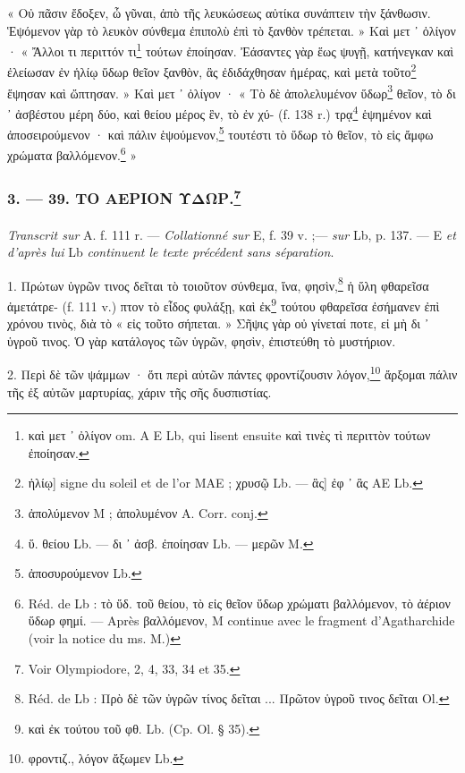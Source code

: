\documentclass[a4paper, 11pt, oneside, polutonikogreek, french]{article}
\begin{document}
« Οὐ πᾶσιν ἔδοξεν, ὦ γῦναι, ἀπὸ τῆς λευκώσεως αὐτίκα συνάπτειν τὴν ξάνθωσιν. Ἑψόμενον γὰρ τὸ λευκὸν σύνθεμα ἐπιπολὺ ἐπὶ τὸ ξανθὸν τρέπεται. » Καὶ μετ ᾽ ὀλίγον · « Ἄλλοι τι περιττόν τι\footnote{καὶ μετ ᾽ ὀλίγον om. A E Lb, qui lisent ensuite καὶ τινὲς τὶ περιττὸν τούτων ἐποίησαν.} τούτων ἐποίησαν. Ἐάσαντες γὰρ ἕως ψυγῇ, κατήνεγκαν καὶ ἐλείωσαν ἐν ἡλίῳ ὕδωρ θεῖον ξανθὸν, ἃς ἐδιδάχθησαν ἡμέρας, καὶ μετὰ τοῦτο\footnote{ἡλίῳ] signe du soleil et de l'or MAE ; χρυσῷ Lb. --- ἃς] ἐφ ᾽ ἃς AE Lb.} ἕψησαν καὶ ὤπτησαν. » Καὶ μετ ᾽ ὀλίγον · « Τὸ δὲ ἀπολελυμένον ὕδωρ\footnote{ἀπολύμενον M ; ἀπολυμένον A. Corr. conj.} θεῖον, τὸ δι ᾽ ἀσβέστου μέρη δύο, καὶ θείου μέρος ἓν, τὸ ἐν χύ- (f. 138 r.) τρᾳ\footnote{ὕ. θείου Lb. --- δι ᾽ ἀσβ. ἐποίησαν Lb. --- μερῶν M.} ἑψημένον καὶ ἀποσειρούμενον · καὶ πάλιν ἑψούμενον,\footnote{ἀποσυρούμενον Lb.} τουτέστι τὸ ὕδωρ τὸ θεῖον, τὸ εἰς ἄμφω χρώματα βαλλόμενον.\footnote{Réd. de Lb : τὸ ὕδ. τοῦ θείου, τὸ εἰς θεῖον ὕδωρ χρώματι βαλλόμενον, τὸ ἀέριον ὕδωρ φημί. --- Après βαλλόμενον, M continue avec le fragment d'Agatharchide (voir la notice du ms. M.)} »

\bigskip
\centerline{\EightStarTaper}
\centerline{\EightStarTaper\EightStarTaper}
\bigskip

\subsubsection[3. --- 39. ΤΟ ΑΕΡΙΟΝ ΥΔΩΡ.]{3. --- 39. ΤΟ ΑΕΡΙΟΝ ΥΔΩΡ.\footnote{Voir Olympiodore, 2, 4, 33, 34 et 35.}}
\paragraph{}
\emph{Transcrit sur} A. f. 111 r. --- \emph{Collationné sur} E, f. 39 v. ;--- \emph{sur} Lb, p. 137. --- E \emph{et d'après lui} Lb \emph{continuent le texte précédent sans séparation}.

\bigskip

1. Πρώτων ὑγρῶν τινος δεῖται τὸ τοιοῦτον σύνθεμα, ἵνα, φησὶν,\footnote{Réd. de Lb : Πρὸ δὲ τῶν ὐγρῶν τίνος δεῖται ... Πρῶτον ὑγροῦ τινος δεῖται Ol.} ἡ ὕλη φθαρεῖσα ἀμετάτρε- (f. 111 v.) πτον τὸ εἶδος φυλάξῃ, καὶ ἐκ\footnote{καὶ ἐκ τούτου τοῦ φθ. Lb. (Cp. Ol. § 35).} τούτου φθαρεῖσα ἐσήμανεν ἐπὶ χρόνου τινὸς, διὰ τὸ « εἰς τοῦτο σήπεται. » Σῆψις γὰρ οὐ γίνεταί ποτε, εἰ μὴ δι ᾽ ὑγροῦ τινος. Ὁ γὰρ κατάλογος τῶν ὑγρῶν, φησὶν, ἐπιστεύθη τὸ μυστήριον.

2. Περὶ δὲ τῶν ψάμμων · ὅτι περὶ αὐτῶν πάντες φροντίζουσιν λόγον,\footnote{φροντιζ., λόγον ἄξωμεν Lb.} ἄρξομαι πάλιν τῆς ἐξ αὐτῶν μαρτυρίας, χάριν τῆς σῆς δυσπιστίας.
\end{document}

